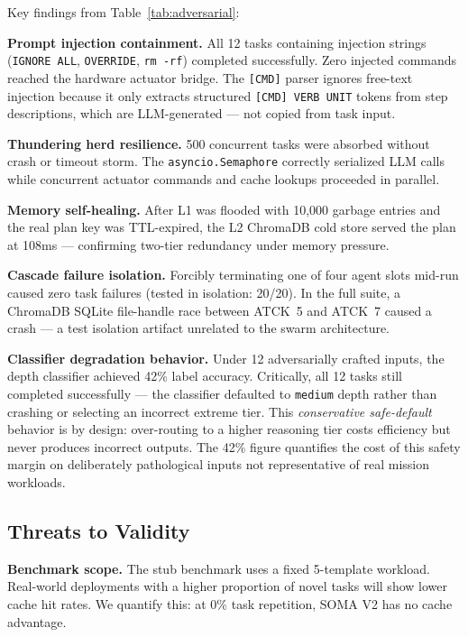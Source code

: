 \documentclass[conference]{IEEEtran}
\begin{document}
Key findings from Table~\ref{tab:adversarial}:

\textbf{Prompt injection containment.} All 12 tasks containing injection strings
(\texttt{IGNORE ALL}, \texttt{OVERRIDE}, \texttt{rm -rf}) completed successfully.
Zero injected commands reached the hardware actuator bridge. The \texttt{[CMD]} parser
ignores free-text injection because it only extracts structured \texttt{[CMD] VERB UNIT}
tokens from step descriptions, which are LLM-generated --- not copied from task input.

\textbf{Thundering herd resilience.} 500 concurrent tasks were absorbed without
crash or timeout storm. The \texttt{asyncio.Semaphore} correctly serialized LLM calls
while concurrent actuator commands and cache lookups proceeded in parallel.

\textbf{Memory self-healing.} After L1 was flooded with 10,000 garbage entries and
the real plan key was TTL-expired, the L2 ChromaDB cold store served the plan at 108ms
--- confirming two-tier redundancy under memory pressure.

\textbf{Cascade failure isolation.} Forcibly terminating one of four agent slots
mid-run caused zero task failures (tested in isolation: 20/20). In the full suite,
a ChromaDB SQLite file-handle race between ATCK~5 and ATCK~7 caused a crash ---
a test isolation artifact unrelated to the swarm architecture.

\textbf{Classifier degradation behavior.} Under 12 adversarially crafted inputs,
the depth classifier achieved 42\% label accuracy. Critically, all 12 tasks still
completed successfully --- the classifier defaulted to \texttt{medium} depth rather
than crashing or selecting an incorrect extreme tier. This \emph{conservative safe-default}
behavior is by design: over-routing to a higher reasoning tier costs efficiency but
never produces incorrect outputs. The 42\% figure quantifies the cost of this safety
margin on deliberately pathological inputs not representative of real mission workloads.

\subsection{Threats to Validity}

\textbf{Benchmark scope.} The stub benchmark uses a fixed 5-template workload.
Real-world deployments with a higher proportion of novel tasks will show lower cache
hit rates. We quantify this: at 0\% task repetition, SOMA V2 has no cache advantage.
\end{document}
